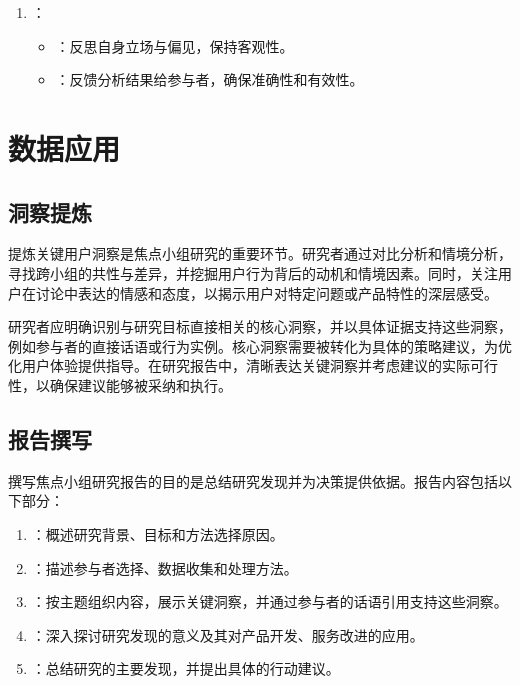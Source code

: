 \documentclass[letterpaper,10pt,english]{sphinxmanual}
\begin{document}
\begin{enumerate}
\begin{itemize}
\end{itemize}

\item {} 
\sphinxAtStartPar
{}：
\begin{itemize}
\item {} 
\sphinxAtStartPar
{}：反思自身立场与偏见，保持客观性。

\item {} 
\sphinxAtStartPar
{}：反馈分析结果给参与者，确保准确性和有效性。

\end{itemize}

\end{enumerate}


\section{数据应用}
\label{\detokenize{user-research/focus-group:id24}}

\subsection{洞察提炼}
\label{\detokenize{user-research/focus-group:id25}}
\sphinxAtStartPar
提炼关键用户洞察是焦点小组研究的重要环节。研究者通过对比分析和情境分析，寻找跨小组的共性与差异，并挖掘用户行为背后的动机和情境因素。同时，关注用户在讨论中表达的情感和态度，以揭示用户对特定问题或产品特性的深层感受。

\sphinxAtStartPar
研究者应明确识别与研究目标直接相关的核心洞察，并以具体证据支持这些洞察，例如参与者的直接话语或行为实例。核心洞察需要被转化为具体的策略建议，为优化用户体验提供指导。在研究报告中，清晰表达关键洞察并考虑建议的实际可行性，以确保建议能够被采纳和执行。


\subsection{报告撰写}
\label{\detokenize{user-research/focus-group:id26}}
\sphinxAtStartPar
撰写焦点小组研究报告的目的是总结研究发现并为决策提供依据。报告内容包括以下部分：
\begin{enumerate}
%
\item {} 
\sphinxAtStartPar
{}：概述研究背景、目标和方法选择原因。

\item {} 
\sphinxAtStartPar
{}：描述参与者选择、数据收集和处理方法。

\item {} 
\sphinxAtStartPar
{}：按主题组织内容，展示关键洞察，并通过参与者的话语引用支持这些洞察。

\item {} 
\sphinxAtStartPar
{}：深入探讨研究发现的意义及其对产品开发、服务改进的应用。

\item {} 
\sphinxAtStartPar
{}：总结研究的主要发现，并提出具体的行动建议。

\end{enumerate}
\end{document}
